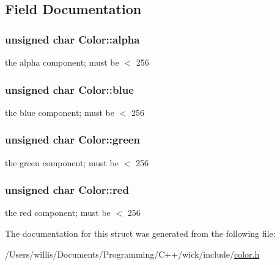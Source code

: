 \subsection{Field Documentation}
\hypertarget{struct_color_af485f621e60e201c55e7dae1966bb29f}{
\subsubsection[{alpha}]{\setlength{\rightskip}{0pt plus 5cm}unsigned char Color\-::alpha}}\label{struct_color_af485f621e60e201c55e7dae1966bb29f}
the alpha component; must be $<$ 256 \hypertarget{struct_color_a5b425af958edb0e7835eb08daeb90e71}{
\subsubsection[{blue}]{\setlength{\rightskip}{0pt plus 5cm}unsigned char Color\-::blue}}\label{struct_color_a5b425af958edb0e7835eb08daeb90e71}
the blue component; must be $<$ 256 \hypertarget{struct_color_a070831365fe6c626bc0020915a917081}{
\subsubsection[{green}]{\setlength{\rightskip}{0pt plus 5cm}unsigned char Color\-::green}}\label{struct_color_a070831365fe6c626bc0020915a917081}
the green component; must be $<$ 256 \hypertarget{struct_color_a245f5a423cdaaaeff27047036c24b7ef}{
\subsubsection[{red}]{\setlength{\rightskip}{0pt plus 5cm}unsigned char Color\-::red}}\label{struct_color_a245f5a423cdaaaeff27047036c24b7ef}
the red component; must be $<$ 256 

The documentation for this struct was generated from the following file\-:\begin{DoxyCompactItemize}
\item 
/\-Users/willis/\-Documents/\-Programming/\-C++/wick/include/\hyperlink{color_8h}{color.\-h}\end{DoxyCompactItemize}

